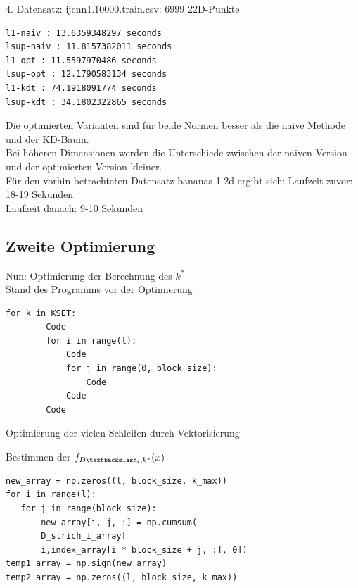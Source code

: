 \documentclass{beamer}
\begin{document}
\begin{frame}[fragile]
4. Datensatz: ijcnn1.10000.train.csv: 6999 
22D-Punkte
\begin{verbatim}
l1-naiv : 13.6359348297 seconds
lsup-naiv : 11.8157382011 seconds
l1-opt : 11.5597970486 seconds
lsup-opt : 12.1790583134 seconds
l1-kdt : 74.1918091774 seconds
lsup-kdt : 34.1802322865 seconds
\end{verbatim}
\end{frame}


\begin{frame}
Die optimierten Varianten sind für beide Normen besser als die naive Methode und der KD-Baum.\\
Bei höheren Dimensionen werden die Unterschiede zwischen der naiven Version und der optimierten Version kleiner.\\
Für den vorhin betrachteten Datensatz bananas-1-2d ergibt sich:
Laufzeit zuvor: 18-19 Sekunden\\
Laufzeit danach: 9-10 Sekunden
\end{frame}

\subsection{Zweite Optimierung}

\begin{frame}[fragile]
Nun: Optimierung der Berechnung des $k^*$\\
Stand des Programms vor der Optimierung
\begin{verbatim}
for k in KSET:
        Code
        for i in range(l):
            Code
            for j in range(0, block_size):
                Code
            Code
        Code
\end{verbatim}
Optimierung der vielen Schleifen durch Vektorisierung
\end{frame}

\begin{frame}[fragile]
Bestimmen der $f_{D \textbackslash _i,k^*} (x)$
\begin{verbatim}
new_array = np.zeros((l, block_size, k_max))  
for i in range(l):
   for j in range(block_size):
       new_array[i, j, :] = np.cumsum(
       D_strich_i_array[
       i,index_array[i * block_size + j, :], 0])
temp1_array = np.sign(new_array)
temp2_array = np.zeros((l, block_size, k_max))
\end{verbatim}
\end{frame}
\end{document}
